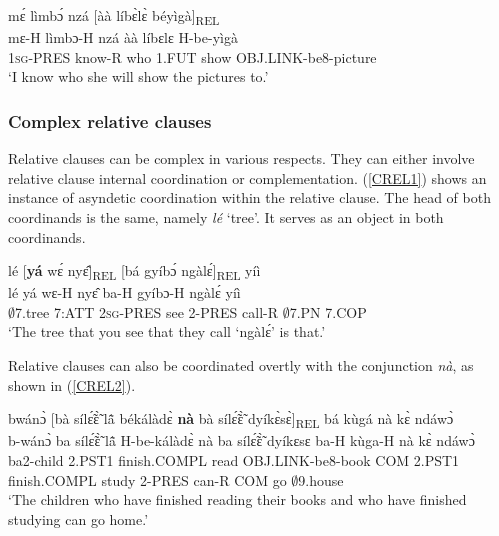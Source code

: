 \begin{exe}
\ex\label{FREL3} 
  \glll mɛ́ lìmbɔ́ nzá [àà líbɛ̀lɛ̀ béyìgà]\textsubscript{REL} \\
          mɛ-H lìmbɔ-H nzá àà líbɛlɛ H-be-yìgà \\
         1\textsc{sg}-PRES know-R who 1.FUT show OBJ.LINK-be8-picture  \\
    \trans `I know who she will show the pictures to.'
\end{exe}







\subsubsection{Complex relative clauses}
\label{sec:ComplREL}

Relative clauses can be complex in various respects. They can either involve relative clause internal coordination or complementation. (\ref{CREL1}) shows an instance of asyndetic coordination within the relative clause. The head of both coordinands is the same, namely {\itshape lé} `tree'. It serves as an object in both coordinands.

\begin{exe} 
\ex\label{CREL1} 
  \glll lé [{\bfseries yá} wɛ́ nyɛ̂]\textsubscript{REL} [bá gyíbɔ́ ngàlɛ́]\textsubscript{REL} yíì \\
        lé yá wɛ-H nyɛ̂ ba-H gyíbɔ-H ngàlɛ́ yíì \\
       $\emptyset$7.tree 7:ATT 2\textsc{sg}-PRES see 2-PRES call-R $\emptyset$7.PN 7.COP   \\
    \trans `The tree that you see that they call `ngàlɛ́' is that.'
\end{exe}

\noindent Relative clauses can also be coordinated overtly with the conjunction {\itshape nà}, as shown in (\ref{CREL2}).

\begin{exe} 
\ex\label{CREL2} 
  \glll bwánɔ̀ [bà sílɛ̃́ɛ̃̀ lã̂ békálàdɛ̀ {\bfseries nà} bà sílɛ̃́ɛ̃̀ dyíkɛ̀sɛ̀]\textsubscript{REL} bá kùgá nà kɛ̀ ndáwɔ̀ \\
        b-wánɔ̀ ba sílɛ̃́ɛ̃̀ lã̂ H-be-kálàdɛ̀ nà ba sílɛ̃́ɛ̃̀ dyíkɛsɛ ba-H kùga-H nà kɛ̀ ndáwɔ̀ \\
       ba2-child 2.PST1 finish.COMPL read OBJ.LINK-be8-book COM 2.PST1 finish.COMPL study 2-PRES can-R COM go $\emptyset$9.house \\
    \trans `The children who have finished reading their books and who have finished studying can go home.'
\end{exe}

